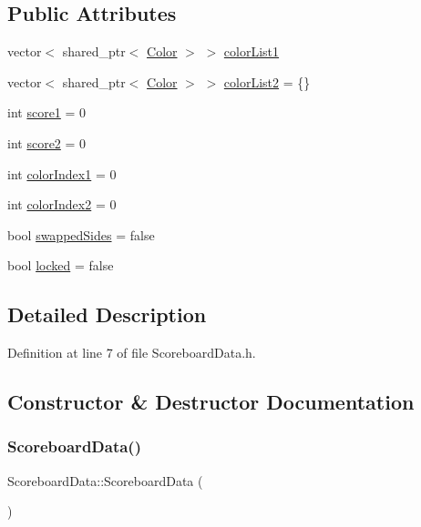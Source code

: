 \subsection*{Public Attributes}
\begin{DoxyCompactItemize}
\item 
vector$<$ shared\+\_\+ptr$<$ \hyperlink{struct_color}{Color} $>$ $>$ \hyperlink{struct_scoreboard_data_afe340df3f7d2b4f4701801ddd82f4941}{color\+List1}
\item 
vector$<$ shared\+\_\+ptr$<$ \hyperlink{struct_color}{Color} $>$ $>$ \hyperlink{struct_scoreboard_data_a96734f5c133d8cc75459b60f71d705de}{color\+List2} = \{\}
\item 
int \hyperlink{struct_scoreboard_data_a6c414dec169989de015aac17eab8adcb}{score1} = 0
\item 
int \hyperlink{struct_scoreboard_data_a51ddc426391e48da3a6c9cf2a3a76e32}{score2} = 0
\item 
int \hyperlink{struct_scoreboard_data_a55a771de3adba23e887ea532f7f4524c}{color\+Index1} = 0
\item 
int \hyperlink{struct_scoreboard_data_accbdaad52d9f539e0f53180c437ab8fa}{color\+Index2} = 0
\item 
bool \hyperlink{struct_scoreboard_data_a6e1aabe8d6abc24c5798c2de90b54c71}{swapped\+Sides} = false
\item 
bool \hyperlink{struct_scoreboard_data_a1538b97991646d1fcfd36377a2e52f67}{locked} = false
\end{DoxyCompactItemize}


\subsection{Detailed Description}


Definition at line 7 of file Scoreboard\+Data.\+h.



\subsection{Constructor \& Destructor Documentation}
\mbox{\label{struct_scoreboard_data_acb3b9d9e9affe90ee7575a24a3cf9819}} 
\subsubsection{\texorpdfstring{Scoreboard\+Data()}{ScoreboardData()}}
{\footnotesize\ttfamily Scoreboard\+Data\+::\+Scoreboard\+Data (\begin{DoxyParamCaption}{ }\end{DoxyParamCaption})\hspace{0.3cm}{\ttfamily [inline]}}



